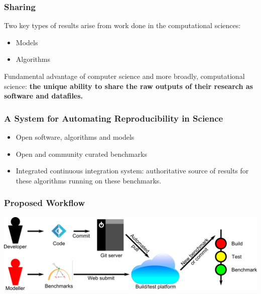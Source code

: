 \documentclass[pdftex]{beamer}
\begin{document}


\begin{frame}
\frametitle{Sharing}
Two key types of results arise from work done in the computational sciences:
\begin{itemize}
\item Models
\item Algorithms
\end{itemize}
\vspace{1em}
Fundamental advantage of computer science and more broadly,
computational science: {\textbf{the unique ability to share the raw outputs of
their research as software and datafiles.}}
\end{frame}

\begin{frame}
\frametitle{A System for Automating Reproducibility in Science}
\begin{itemize}
\item Open software, algorithms and models
\item Open and community curated benchmarks
\item Integrated continuous integration system: authoritative source of results for these algorithms running on these benchmarks.
\end{itemize}
\end{frame}

\begin{frame}
\frametitle{Proposed Workflow}
\begin{center}
\includegraphics[width=0.9\paperwidth]{workflow.png}
\end{center}
\end{frame}
\end{document}
